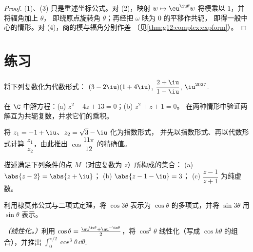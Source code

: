 \begin{proof}
(1)、(3) 只是重述坐标公式。对 (2)，映射
$w \mapsto \eu^{\iu\theta} w$ 将模乘以 $1$，并将辐角加上 $\theta$，
即绕原点旋转角 $\theta$；再经把 $\omega$ 映为 $0$ 的平移作共轭，
即得一般中心的情形。对
(4)，商的模与辐角分别作差
（见\cref{thm:g12:complex:expform}）。
\end{proof}

\section{练习}

\begin{exercise}[$\star$]\label{exo:g12:complex:1}
将下列复数化为代数形式：
$(3 - 2\iu)(1 + 4\iu)$, \quad $\dfrac{2 + \iu}{1 - \iu}$, \quad
$\iu^{2027}$.
\end{exercise}

\begin{exercise}[$\star$]\label{exo:g12:complex:2}
在 $\C$ 中解方程：(a) $z^2 - 4z + 13 = 0$；(b) $z^2 + z + 1 = 0$。
在两种情形中验证两解互为共轭复数，并求它们的乘积。
\end{exercise}

\begin{exercise}[$\star$]\label{exo:g12:complex:3}
将 $z_1 = -1 + \iu$、$z_2 = \sqrt3 - \iu$ 化为指数形式，
并先以指数形式、再以代数形式计算 $\dfrac{z_1}{z_2}$，由此推出
$\cos\dfrac{11\pi}{12}$ 的精确值。
\end{exercise}

\begin{exercise}[$\star\star$]\label{exo:g12:complex:4}
描述满足下列条件的点 $M$（对应复数为 $z$）所构成的集合：
(a) $\abs{z - 2} = \abs{z + \iu}$；\quad
(b) $\abs{z - 1 - \iu} = 3$；\quad
(c) $\dfrac{z - 1}{z + 1}$ 为纯虚数。
\end{exercise}

\begin{exercise}[$\star\star$]\label{exo:g12:complex:5}
利用棣莫弗公式与二项式定理，将 $\cos 3\theta$
表示为 $\cos\theta$ 的多项式，并将 $\sin 3\theta$ 用
$\sin\theta$ 表示。
\end{exercise}

\begin{exercise}[$\star\star$]\label{exo:g12:complex:6}
\emph{（线性化。）}利用
$\cos\theta = \frac{\eu^{\iu\theta} + \eu^{-\iu\theta}}{2}$，将
$\cos^3\theta$ 线性化（写成 $\cos k\theta$ 的组合），并推出
$\displaystyle\int_0^{\pi/2}\cos^3\theta\,\dd\theta$.
\end{exercise}

